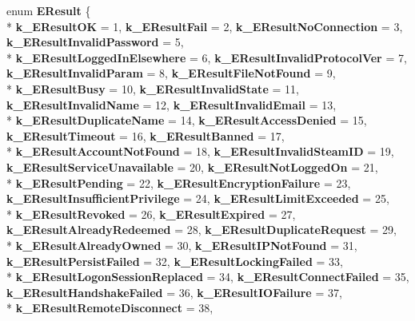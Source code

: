 \begin{DoxyCompactItemize}
\item 
\hypertarget{namespaceValve_1_1Steamworks_ac9a06628ca2b4adbfebbcfb3a54c40ca}{}enum {\bfseries E\+Result} \{ \\*
{\bfseries k\+\_\+\+E\+Result\+O\+K} = 1, 
{\bfseries k\+\_\+\+E\+Result\+Fail} = 2, 
{\bfseries k\+\_\+\+E\+Result\+No\+Connection} = 3, 
{\bfseries k\+\_\+\+E\+Result\+Invalid\+Password} = 5, 
\\*
{\bfseries k\+\_\+\+E\+Result\+Logged\+In\+Elsewhere} = 6, 
{\bfseries k\+\_\+\+E\+Result\+Invalid\+Protocol\+Ver} = 7, 
{\bfseries k\+\_\+\+E\+Result\+Invalid\+Param} = 8, 
{\bfseries k\+\_\+\+E\+Result\+File\+Not\+Found} = 9, 
\\*
{\bfseries k\+\_\+\+E\+Result\+Busy} = 10, 
{\bfseries k\+\_\+\+E\+Result\+Invalid\+State} = 11, 
{\bfseries k\+\_\+\+E\+Result\+Invalid\+Name} = 12, 
{\bfseries k\+\_\+\+E\+Result\+Invalid\+Email} = 13, 
\\*
{\bfseries k\+\_\+\+E\+Result\+Duplicate\+Name} = 14, 
{\bfseries k\+\_\+\+E\+Result\+Access\+Denied} = 15, 
{\bfseries k\+\_\+\+E\+Result\+Timeout} = 16, 
{\bfseries k\+\_\+\+E\+Result\+Banned} = 17, 
\\*
{\bfseries k\+\_\+\+E\+Result\+Account\+Not\+Found} = 18, 
{\bfseries k\+\_\+\+E\+Result\+Invalid\+Steam\+I\+D} = 19, 
{\bfseries k\+\_\+\+E\+Result\+Service\+Unavailable} = 20, 
{\bfseries k\+\_\+\+E\+Result\+Not\+Logged\+On} = 21, 
\\*
{\bfseries k\+\_\+\+E\+Result\+Pending} = 22, 
{\bfseries k\+\_\+\+E\+Result\+Encryption\+Failure} = 23, 
{\bfseries k\+\_\+\+E\+Result\+Insufficient\+Privilege} = 24, 
{\bfseries k\+\_\+\+E\+Result\+Limit\+Exceeded} = 25, 
\\*
{\bfseries k\+\_\+\+E\+Result\+Revoked} = 26, 
{\bfseries k\+\_\+\+E\+Result\+Expired} = 27, 
{\bfseries k\+\_\+\+E\+Result\+Already\+Redeemed} = 28, 
{\bfseries k\+\_\+\+E\+Result\+Duplicate\+Request} = 29, 
\\*
{\bfseries k\+\_\+\+E\+Result\+Already\+Owned} = 30, 
{\bfseries k\+\_\+\+E\+Result\+I\+P\+Not\+Found} = 31, 
{\bfseries k\+\_\+\+E\+Result\+Persist\+Failed} = 32, 
{\bfseries k\+\_\+\+E\+Result\+Locking\+Failed} = 33, 
\\*
{\bfseries k\+\_\+\+E\+Result\+Logon\+Session\+Replaced} = 34, 
{\bfseries k\+\_\+\+E\+Result\+Connect\+Failed} = 35, 
{\bfseries k\+\_\+\+E\+Result\+Handshake\+Failed} = 36, 
{\bfseries k\+\_\+\+E\+Result\+I\+O\+Failure} = 37, 
\\*
{\bfseries k\+\_\+\+E\+Result\+Remote\+Disconnect} = 38, 

\end{DoxyCompactItemize}
